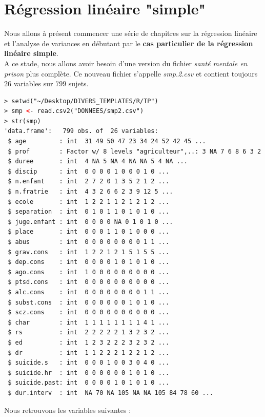 \section{Régression linéaire "simple"}
Nous allons à présent commencer une série de chapitres sur la régression linéaire et l'analyse de variances en débutant par le \textbf{cas particulier de la régression linéaire simple}.\newline
\\
A ce stade, nous allons avoir besoin d'une version du fichier \textit{santé mentale en prison} plus complète. Ce nouveau fichier s'appelle \textit{smp.2.csv} et contient toujours $26$ variables sur $799$ sujets.\newline
\begin{lstlisting}[language=html]
> setwd("~/Desktop/DIVERS_TEMPLATES/R/TP")
> smp <- read.csv2("DONNEES/smp2.csv")
> str(smp)
'data.frame':	799 obs. of  26 variables:
 $ age         : int  31 49 50 47 23 34 24 52 42 45 ...
 $ prof        : Factor w/ 8 levels "agriculteur",..: 3 NA 7 6 8 6 3 2 6 6 ...
 $ duree       : int  4 NA 5 NA 4 NA NA 5 4 NA ...
 $ discip      : int  0 0 0 0 1 0 0 0 1 0 ...
 $ n.enfant    : int  2 7 2 0 1 3 5 2 1 2 ...
 $ n.fratrie   : int  4 3 2 6 6 2 3 9 12 5 ...
 $ ecole       : int  1 2 2 1 1 2 1 2 1 2 ...
 $ separation  : int  0 1 0 1 1 0 1 0 1 0 ...
 $ juge.enfant : int  0 0 0 0 NA 0 1 0 1 0 ...
 $ place       : int  0 0 0 1 1 0 1 0 0 0 ...
 $ abus        : int  0 0 0 0 0 0 0 0 1 1 ...
 $ grav.cons   : int  1 2 2 1 2 1 5 1 5 5 ...
 $ dep.cons    : int  0 0 0 0 1 0 1 0 1 0 ...
 $ ago.cons    : int  1 0 0 0 0 0 0 0 0 0 ...
 $ ptsd.cons   : int  0 0 0 0 0 0 0 0 0 0 ...
 $ alc.cons    : int  0 0 0 0 0 0 0 0 1 1 ...
 $ subst.cons  : int  0 0 0 0 0 0 1 0 1 0 ...
 $ scz.cons    : int  0 0 0 0 0 0 0 0 0 0 ...
 $ char        : int  1 1 1 1 1 1 1 1 4 1 ...
 $ rs          : int  2 2 2 2 2 1 3 2 3 2 ...
 $ ed          : int  1 2 3 2 2 2 3 2 3 2 ...
 $ dr          : int  1 1 2 2 2 1 2 2 1 2 ...
 $ suicide.s   : int  0 0 0 1 0 0 3 0 4 0 ...
 $ suicide.hr  : int  0 0 0 0 0 0 1 0 1 0 ...
 $ suicide.past: int  0 0 0 0 1 0 1 0 1 0 ...
 $ dur.interv  : int  NA 70 NA 105 NA NA 105 84 78 60 ...
\end{lstlisting}
Nous retrouvons les variables suivantes : 
